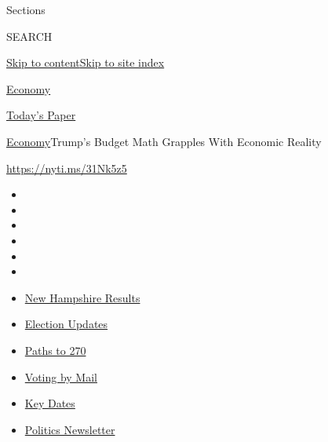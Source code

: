 Sections

SEARCH

\protect\hyperlink{site-content}{Skip to
content}\protect\hyperlink{site-index}{Skip to site index}

\href{https://www.nytimes3xbfgragh.onion/section/business/economy}{Economy}

\href{https://myaccount.nytimes3xbfgragh.onion/auth/login?response_type=cookie\&client_id=vi}{}

\href{https://www.nytimes3xbfgragh.onion/section/todayspaper}{Today's
Paper}

\href{/section/business/economy}{Economy}\textbar{}Trump's Budget Math
Grapples With Economic Reality

\url{https://nyti.ms/31Nk5z5}

\begin{itemize}
\item
\item
\item
\item
\item
\item
\end{itemize}

\begin{itemize}
\item
  \href{https://www.nytimes3xbfgragh.onion/interactive/2020/09/08/us/elections/results-new-hampshire-primary-elections.html?action=click\&pgtype=Article\&state=default\&region=TOP_BANNER\&context=storylines_menu}{New
  Hampshire Results}
\item
  \href{https://www.nytimes3xbfgragh.onion/live/2020/09/08/us/trump-vs-biden?action=click\&pgtype=Article\&state=default\&region=TOP_BANNER\&context=storylines_menu}{Election
  Updates}
\item
  \href{https://www.nytimes3xbfgragh.onion/interactive/2020/us/elections/election-states-biden-trump.html?action=click\&pgtype=Article\&state=default\&region=TOP_BANNER\&context=storylines_menu}{Paths
  to 270}
\item
  \href{https://www.nytimes3xbfgragh.onion/interactive/2020/08/31/us/politics/vote-by-mail-deadlines.html?action=click\&pgtype=Article\&state=default\&region=TOP_BANNER\&context=storylines_menu}{Voting
  by Mail}
\item
  \href{https://www.nytimes3xbfgragh.onion/interactive/2019/us/elections/2020-presidential-election-calendar.html?action=click\&pgtype=Article\&state=default\&region=TOP_BANNER\&context=storylines_menu}{Key
  Dates}
\item
  \href{https://www.nytimes3xbfgragh.onion/newsletters/politics?action=click\&pgtype=Article\&state=default\&region=TOP_BANNER\&context=storylines_menu}{Politics
  Newsletter}
\end{itemize}

